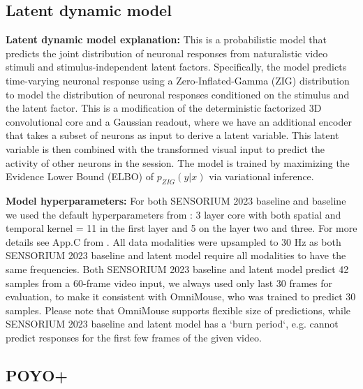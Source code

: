 \documentclass{article} %
\begin{document}
\subsection{Latent dynamic model}
\textbf{Latent dynamic model explanation:} This is a probabilistic model that predicts the joint distribution of neuronal responses from naturalistic video stimuli and stimulus-independent latent factors. Specifically, the model predicts time-varying neuronal response using a Zero-Inflated-Gamma (ZIG) distribution to model the distribution of neuronal responses conditioned on the stimulus and the latent factor. This is a modification of the deterministic factorized 3D convolutional core and a Gaussian readout, where we have an additional encoder that takes a subset of neurons as input to derive a latent variable. This latent variable is then combined with the transformed visual input to predict the activity of other neurons in the session. The model is trained by maximizing the Evidence Lower Bound (ELBO) of $p_{ZIG}(y|x)$ via variational inference.

\textbf{Model hyperparameters:} For both SENSORIUM 2023 baseline and \citet{schmidt2025modelingdynamicneuralactivity} baseline we used the default hyperparameters from \citet{schmidt2025modelingdynamicneuralactivity}: 3 layer core with both spatial and temporal kernel = 11 in the first layer and 5 on the layer two and three.
For more details see App.C from \citet{schmidt2025modelingdynamicneuralactivity}.
All data modalities were upsampled to 30 Hz as both SENSORIUM 2023 baseline and \citet{schmidt2025modelingdynamicneuralactivity} latent model require all modalities to have the same frequencies.
Both SENSORIUM 2023 baseline and \citet{schmidt2025modelingdynamicneuralactivity} latent model predict 42 samples from a 60-frame video input, we always used only last 30 frames for evaluation, to make it consistent with OmniMouse, who was trained to predict 30 samples.
Please note that OmniMouse supports flexible size of predictions, while  SENSORIUM 2023 baseline and \citet{schmidt2025modelingdynamicneuralactivity} latent model has a `burn period`, e.g. cannot predict responses for the first few frames of the given video.

\subsection{POYO+}
\end{document}
